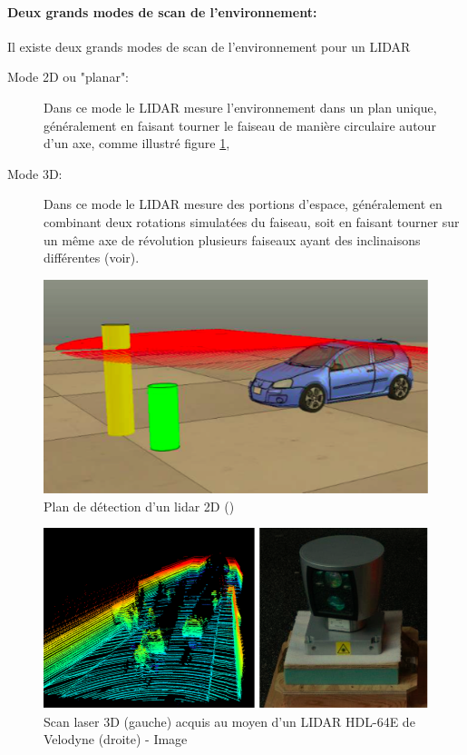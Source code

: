 \documentclass[12pt,a4paper]{report}
\begin{document}
		\paragraph*{Deux grands modes de scan de l'environnement:} Il existe deux grands modes de scan de l'environnement pour un LIDAR
		
		\begin{description}
			\item[Mode 2D ou  "planar":] Dans ce mode le LIDAR mesure l'environnement dans un plan unique, généralement en faisant tourner le faiseau de manière circulaire autour d'un axe, comme illustré figure \ref{fig:lidar2d},
			\item[Mode 3D:] Dans ce mode le LIDAR mesure des portions d'espace, généralement en combinant deux rotations simulatées du faiseau, soit en faisant tourner sur un même axe de révolution plusieurs faiseaux ayant des inclinaisons différentes (voir).
		\end{description}
	
	\begin{figure}[h!]
		\centering
		\includegraphics[width=0.7\linewidth]{img/lidar2d}
		\caption[Lidar 2D]{Plan de détection d'un lidar 2D (\cite{yalcin_approaches_2013})}
		\label{fig:lidar2d}
	\end{figure}

	\begin{figure}[h!]
	\centering
	\includegraphics[width=0.7\linewidth]{img/lidar3d}
	\caption[lidar3d]{Scan laser 3D (gauche) acquis au moyen d'un LIDAR \hspace{\textwidth} HDL-64E de Velodyne (droite) - Image \cite{steinbauer_tedusar_2014}}
	\label{fig:lidar3d}
	\end{figure}
\end{document}
